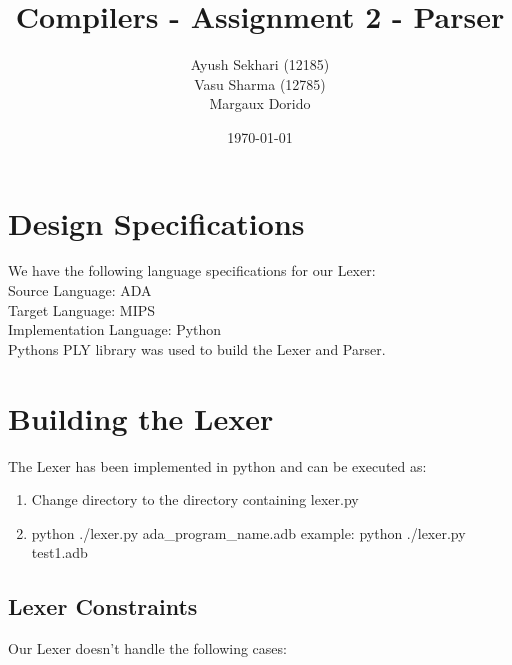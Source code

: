 \documentclass[12pt]{article}%
\begin{document}
\title{Compilers - Assignment 2 - Parser}
\author{Ayush Sekhari (12185) \\ Vasu Sharma (12785) \\ Margaux Dorido}
\date{\today}
\maketitle
\section{Design Specifications}
We have the following language specifications for our Lexer: \\
Source Language: ADA \\
Target Language: MIPS \\
Implementation Language: Python \\ 
Pythons PLY library was used to build the Lexer and Parser. 

\section{Building the Lexer}
The Lexer has been implemented in python and can be executed as:
\begin{enumerate}


\item  Change directory to the directory containing lexer.py
\item  python ./lexer.py ada\_program\_name.adb
example: python ./lexer.py test1.adb

\end{enumerate}

\subsection{Lexer Constraints}
Our Lexer doesn’t handle the following cases:
\end{document}
